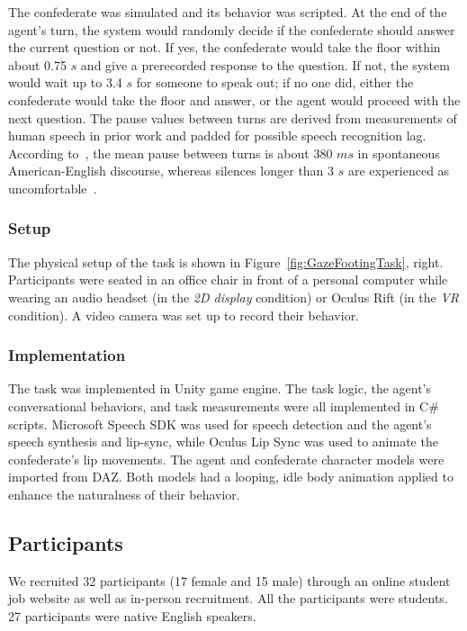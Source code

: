 The confederate was simulated and its behavior was scripted. At the end of the agent's turn, the system would randomly decide if the confederate should answer the current question or not. If yes, the confederate would take the floor within about 0.75 $s$ and give a prerecorded response to the question. If not, the system would wait up to 3.4 $s$ for someone to speak out; if no one did, either the confederate would take the floor and answer, or the agent would proceed with the next question. The pause values between turns are derived from measurements of human speech in prior work and padded for possible speech recognition lag. According to~\citet{weilhammer2003durational}, the mean pause between turns is about 380 $ms$ in spontaneous American-English discourse, whereas silences longer than 3 $s$ are experienced as uncomfortable~\citep{mclaughlin1982awkward}.

\subsubsection{Setup}

The physical setup of the task is shown in Figure~\ref{fig:GazeFootingTask}, right. Participants were seated in an office chair in front of a personal computer while wearing an audio headset (in the \emph{2D display} condition) or Oculus Rift (in the \emph{VR} condition). A video camera was set up to record their behavior.

\subsubsection{Implementation}

The task was implemented in Unity game engine. The task logic, the agent's conversational behaviors, and task measurements were all implemented in C\# scripts. Microsoft Speech SDK was used for speech detection and the agent's speech synthesis and lip-sync, while Oculus Lip Sync was used to animate the confederate's lip movements. The agent and confederate character models were imported from DAZ. Both models had a looping, idle body animation applied to enhance the naturalness of their behavior.

\subsection{Participants}

We recruited 32 participants (17 female and 15 male) through an online student job website as well as in-person recruitment. All the participants were students. 27 participants were native English speakers.

